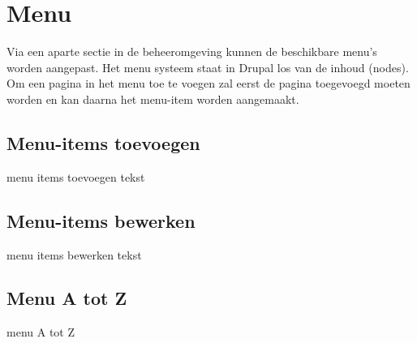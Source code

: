 \section{Menu}\label{menu}
Via een aparte sectie in de beheeromgeving kunnen de beschikbare menu's worden aangepast. Het menu systeem staat in Drupal los van de inhoud (nodes). Om een pagina in het menu toe te voegen zal eerst de pagina toegevoegd moeten worden en kan daarna het menu-item worden aangemaakt.

\subsection{Menu-items toevoegen}\label{menuitemstoevoegen}
menu items toevoegen tekst

\subsection{Menu-items bewerken}\label{menuitemsbewerken}
menu items bewerken tekst

\subsection{Menu A tot Z}\label{menuatotz}
menu A tot Z